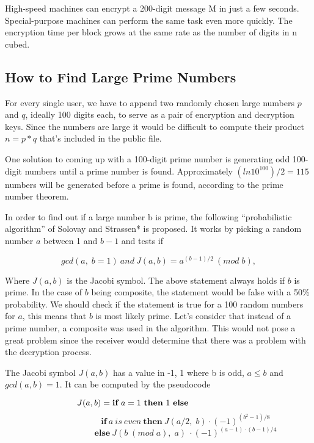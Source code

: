 \documentclass[12pt, letterpaper]{article}
\begin{document}
High-speed machines can encrypt a 200-digit message M in just a few seconds. Special-purpose machines can perform the same task even more quickly. The encryption time per block grows at the same rate as the number of digits in n cubed.

\subsection{How to Find Large Prime Numbers}

For every single user, we have to append two randomly chosen large numbers $p$ and $q$, ideally 100 digits each, to serve as a pair of encryption and decryption keys. Since the numbers are large it would be difficult to compute their product $n = p*q$ that’s included in the public file. 

One solution to coming up with a 100-digit prime number is generating odd 100-digit numbers until a prime number is found. Approximately $(ln 10^100)/2 = 115$ numbers will be generated before a prime is found, according to the prime number theorem.

In order to find out if a large number b is prime, the following “probabilistic algorithm” of Solovay and Strassen* is proposed. It works by picking a random number $a$ between 1 and $b-1$ and tests if

\[ gcd(a, \; b = 1) \ and \ J(a, b) = a^{(b-1)/2} \ (mod \; b),\]

Where $J(a,b)$ is the Jacobi symbol. The above statement always holds if $b$ is prime. In the case of $b$ being composite, the statement would be false with a 50\% probability. We should check if the statement is true for a 100 random numbers for $a$, this means that $b $ is most likely prime. Let’s consider that instead of a prime number, a composite was used in the algorithm. This would not pose a great problem since the receiver would determine that there was a problem with the decryption process. 

The Jacobi symbol $J(a, b)$ has a value in {-1, 1} where b is odd, $a \leq b$ and $gcd(a, b) = 1$. It can be computed by the pseudocode

\begin{spacing}{0.3}
\[ \mkern-18mu \mkern-18mu \mkern-18mu \mkern-18mu \mkern-18mu \mkern-18mu J(a, b) = \textbf{if} \ a = 1 \ \textbf{then} \ 1 \ \textbf{else} \]
\[ \qquad \qquad \qquad \; \textbf{if} \ a \ is \ even \ \textbf{then} \ J(a/2, \; b) \cdot (-1)^{(b^2-1)/8} \]
\[ \qquad \qquad \qquad \; \textbf{else} \ J(b \; (mod \; a), \; a) \ \cdot (-1)^{(a-1)\cdot(b-1)/4} \]
\end{spacing}
\end{document}
